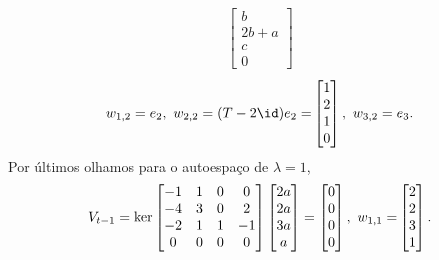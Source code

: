 {{\begin{align*}
\begin{bmatrix}
    b \\ 2b + a \\ c \\ 0
\end{bmatrix}
\end{align*}}
{\small \[\text{\normalsize $w_{1,2} = e_2, \ w_{2,2} = (T- 2 \id ) e_2 =$} \begin{bmatrix} 
   1 \\ 2 \\ 1 \\ 0
\end{bmatrix}, \ \text{\normalsize $w_{3,2} = e_3$}. \] }
Por últimos olhamos para o autoespaço de \(\lambda = 1\), 
{\small \begin{align*}\text{\normalsize $V_{t-1}$} = \ker\begin{bmatrix}
-1 & 1 & 0 & 0 \\ 
-4 & 3 & 0 & 2 \\ 
-2 & 1 & 1 & -1 \\ 
0 & 0 & 0 & 0   
\end{bmatrix}\begin{bmatrix}
    2a \\ 2a \\ 3a \\ a
\end{bmatrix} = \begin{bmatrix}
    0 \\ 0 \\ 0 \\ 0
\end{bmatrix}, \ \text{\normalsize $w_{1,1} = $} \begin{bmatrix}
    2 \\ 2 \\ 3 \\ 1 
\end{bmatrix}. 
\end{align*}}
}